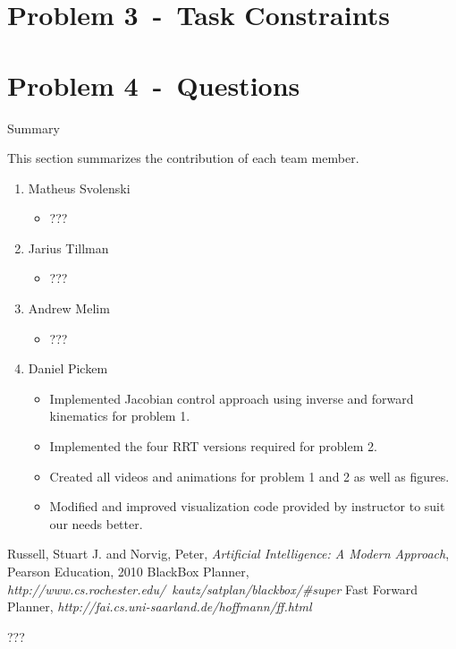 \documentclass[12pt]{article}
\newcommand{\problem}[2]{\section*{Problem {#1}~-~{#2}}}
\begin{document}
\problem{3}{Task Constraints}
\label{sec:problem_3}

\problem{4}{Questions}
\label{sec:problem_4}

\newpage
\begin{center}
\Huge{Summary} 
\end{center}
This section summarizes the contribution of each team member. 

\begin{enumerate}
  \item Matheus Svolenski
    \begin{itemize}
     \item ???
    \end{itemize}

  \item Jarius Tillman
   \begin{itemize}
     \item ???
    \end{itemize}
  \item Andrew Melim
    \begin{itemize}
     \item ???
    \end{itemize}

  \item Daniel Pickem
    \begin{itemize}
     \item Implemented Jacobian control approach using inverse and forward kinematics for problem 1.
     \item Implemented the four RRT versions required for problem 2.
     \item Created all videos and animations for problem 1 and 2 as well as figures.
     \item Modified and improved visualization code provided by instructor to suit our needs better. 
    \end{itemize}
\end{enumerate}

\begin{thebibliography}{50}
   Russell, Stuart J. and Norvig, Peter, \textsl{Artificial Intelligence: A Modern Approach}, Pearson Education, 2010
   BlackBox Planner, \textsl{http://www.cs.rochester.edu/~kautz/satplan/blackbox/\#super}
   Fast Forward Planner, \textsl{http://fai.cs.uni-saarland.de/hoffmann/ff.html}
\end{thebibliography}

\newpage
\begin{appendix}
???
\end{appendix}

\newpage
\end{document}
